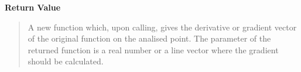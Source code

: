 \begin{boxedminipage}{\textwidth}
\begin{quote}
      \end{quote}

    \vspace{1ex}

      \textbf{Return Value}
      \begin{quote}

A new function which, upon calling, gives the derivative or gradient
vector of the original function on the analised point. The parameter of
the returned function is a real number or a line vector where the gradient
should be calculated.
      \end{quote}

    \vspace{1ex}

    \end{boxedminipage}

    \label{peach:optm:optm:hessian}

    \vspace{0.5ex}

